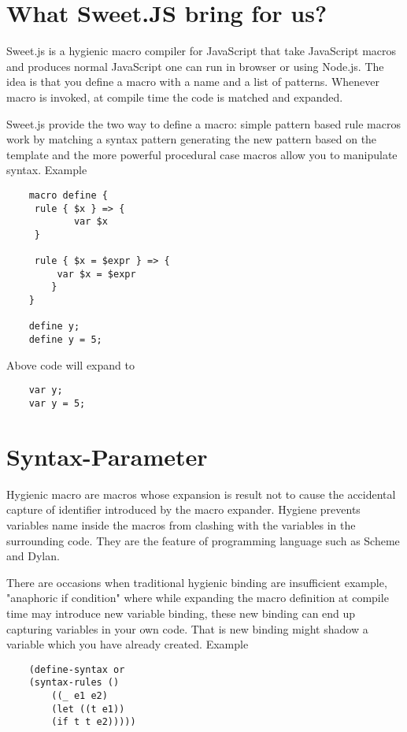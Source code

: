 \section{What Sweet.JS bring for us?}

Sweet.js is a hygienic macro compiler for JavaScript that take JavaScript macros and produces normal JavaScript one can run in browser or using Node.js. The idea is that you define a macro with a name and a list of patterns. Whenever macro is invoked, at compile time the code is matched and expanded. 

Sweet.js provide the two way to define a macro: simple pattern based rule macros work by matching a syntax pattern generating the new pattern based on the template and the more powerful procedural case macros allow you to manipulate syntax. Example

\begin{lstlisting}
	macro define {
   	 rule { $x } => {
   		    var $x
   	 }

   	 rule { $x = $expr } => {
   	     var $x = $expr
    	}
	}

	define y;
	define y = 5;
\end{lstlisting}

Above code will expand to

\begin{lstlisting}
	var y;
	var y = 5;
\end{lstlisting}

\section{Syntax-Parameter}

Hygienic macro are macros whose expansion is result not to cause the accidental capture of identifier introduced by the macro expander. Hygiene prevents variables name inside the macros from clashing with the variables in the surrounding code. They are the feature of programming language such as Scheme and Dylan. 

There are occasions when traditional hygienic binding are insufficient example, "anaphoric if condition"
where while expanding the macro definition at compile time may introduce new variable binding, these new binding can end up capturing variables in your own code. That is new binding might shadow a variable which you have already created. Example

\begin{lstlisting}
	(define-syntax or
  	(syntax-rules ()
    	((_ e1 e2)
     	(let ((t e1))
       	(if t t e2)))))
\end{lstlisting}

